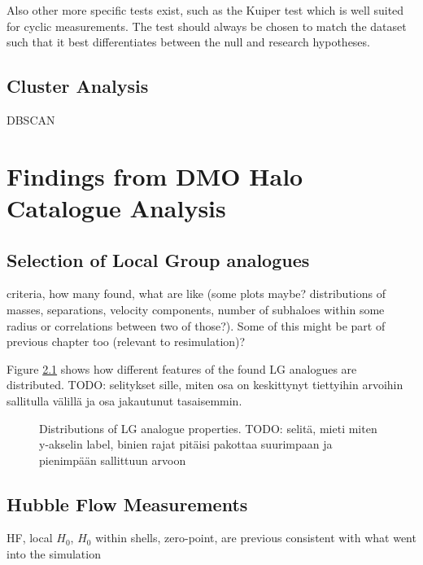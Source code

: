 \documentclass[english, oneside]{HYgradu}
\begin{document}
\reversemarginpar
{}
Also other more specific tests exist, such as the Kuiper test which is well suited for cyclic measurements. The test should always be chosen to match the dataset such that it best differentiates between the null and research hypotheses.

\section{Cluster Analysis}
DBSCAN

\chapter{Findings from DMO Halo Catalogue Analysis}
\section{Selection of Local Group analogues}
criteria, how many found, what are like (some plots maybe? distributions of masses, separations, velocity components, number of subhaloes within some radius or correlations between two of those?). Some of this might be part of previous chapter too (relevant to resimulation)?

\reversemarginpar
{}
Figure \ref{fig:LGproperties} shows how different features of the found LG analogues are distributed. TODO: selitykset sille, miten osa on keskittynyt tiettyihin arvoihin sallitulla välillä ja osa jakautunut tasaisemmin. 

\begin{figure}
    \centering
    
    \caption{Distributions of LG analogue properties. TODO: selitä, mieti miten y-akselin label, binien rajat pitäisi pakottaa suurimpaan ja pienimpään sallittuun arvoon}\label{fig:LGproperties}
\end{figure}


\section{Hubble Flow Measurements}
HF, local $H_0$, $H_0$ within shells, zero-point, are previous consistent with what went into the simulation
\end{document}
